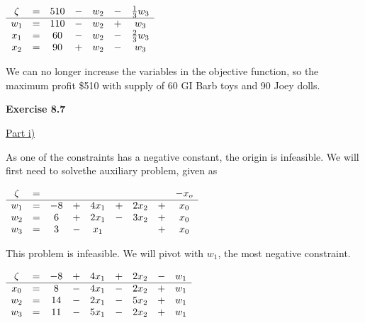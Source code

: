 \documentclass[letterpaper,12pt]{article}
\begin{document}
\begin{center}
	$\begin{array}{ c c c c c c c c  }
	\zeta & = & 510 & - & w_2 & - & \frac{1}{3}w_3 \\
	\hline
	w_1 & = & 110 & - & w_2 & + & w_3 \\
	x_1 & = & 60 & - & w_2 & - & \frac{2}{3}w_3 \\
	x_2 & = & 90 & + & w_2 & - & w_3 \\
	\end{array}$ \\
\end{center}

We can no longer increase the variables in the objective function, so the maximum profit \$510 with supply of 60 GI Barb toys and 90 Joey dolls.

\textbf{Exercise 8.7}

\underline{Part i)}

As one of the constraints has a negative constant, the origin is infeasible. We will first need to solvethe auxiliary problem, given as
\begin{center}
	$\begin{array}{ c c c c c c c c c c }
	\zeta & = &  &   &      &   &      &   & -x_o \\
	\hline
	w_1 & = & -8 & + & 4x_1 & + & 2x_2 & + & x_0 \\
	w_2 & = & 6  & + & 2x_1 & - & 3x_2 & + & x_0 \\
	w_3 & = & 3  & - & x_1  &   &      & + & x_0 \\
	\end{array}$ \\
\end{center}

This problem is infeasible. We will pivot with $w_1$, the most negative constraint.
\begin{center}
	$\begin{array}{ c c c c c c c c c c }
	\zeta & = & -8 &  + & 4x_1 & + & 2x_2 & - & w_1 \\
	\hline
	x_0 & = & 8 & - & 4x_1 & - & 2x_2 & + & w_1 \\
	w_2 & = & 14  & - & 2x_1 & - & 5x_2 & + & w_1 \\
	w_3 & = & 11  & - & 5x_1  & -  &  2x_2 & + & w_1 \\
	\end{array}$ \\
\end{center}
\end{document}
